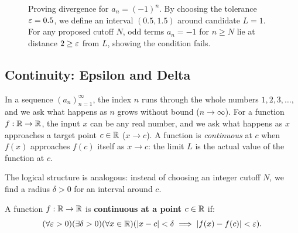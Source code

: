 \begin{figure}[htbp]
\caption{Proving divergence for $a_n = (-1)^n$. By choosing the tolerance $\varepsilon = 0.5$, we define an interval $(0.5, 1.5)$ around candidate $L = 1$. For any proposed cutoff $N$, odd terms $a_n = -1$ for $n \ge N$ lie at distance $2 \ge \varepsilon$ from $L$, showing the condition fails.}\label{20:fig-divergence-witness}
\end{figure}

\subsection{Continuity: Epsilon and Delta}

In a sequence $(a_n)_{n=1}^\infty$, the index $n$ runs through the whole numbers $1, 2, 3, \dots$, and we ask what happens as $n$ grows without bound ($n \to \infty$). For a function $f: \mathbb{R} \to \mathbb{R}$, the input $x$ can be any real number, and we ask what happens as $x$ approaches a target point $c \in \mathbb{R}$ ($x \to c$). A function is \emph{continuous} at $c$ when $f(x)$ approaches $f(c)$ itself as $x \to c$: the limit $L$ is the actual value of the function at $c$.

The logical structure is analogous: instead of choosing an integer cutoff $N$, we find a radius $\delta > 0$ for an interval around $c$.

\begin{definition}
A function $f: \mathbb{R} \to \mathbb{R}$ is \textbf{continuous at a point $c \in \mathbb{R}$} if:
\[
(\forall \varepsilon > 0)(\exists \delta > 0)(\forall x \in \mathbb{R})(|x - c| < \delta \implies |f(x) - f(c)| < \varepsilon).
\]
\end{definition}

